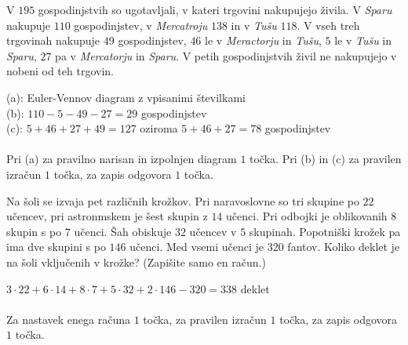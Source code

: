 \documentclass[addpoints]{exam}
\begin{document}
\begin{questions}
    \question
    V $195$ gospodinjstvih so ugotavljali, v kateri trgovini nakupujejo živila. V \textit{Sparu} nakupuje $110$ gospodinjstev, v \textit{Mercatroju} $138$ in v \textit{Tušu} $118$.
    V vseh treh trgovinah nakupuje $49$ gospodinjstev, $46$ le v \textit{Meractorju} in \textit{Tušu}, $5$ le v \textit{Tušu} in \textit{Sparu}, $27$ pa v \textit{Mercatorju} in \textit{Sparu}. 
    V petih gospodinjstvih živil ne nakupujejo v nobeni od teh trgovin.

    \begin{solution}[8.5cm]
        (a): Euler-Vennov diagram z vpisanimi številkami \\
        (b): $110-5-49-27=29$ gospodinjstev\\
        (c): $5+46+27+49=127$ oziroma $5+46+27=78$ gospodinjstev \\ \\
        Pri (a) za pravilno narisan in izpolnjen diagram $1$ točka. Pri (b) in (c) za pravilen izračun $1$ točka, za zapis odgovora $1$ točka.
    \end{solution}




     \newpage
        

    \question[3]
    Na šoli se izvaja pet različnih krožkov. Pri naravoslovne so tri skupine po $22$ učencev, pri astronmskem je šest skupin z $14$ učenci. Pri odbojki je oblikovanih $8$ skupin s po $7$ učenci. Šah obiskuje $32$ učencev v $5$ skupinah. Popotniški krožek pa ima dve skupini s po $146$ učenci.
    Med vsemi učenci je 320 fantov. Koliko deklet je na šoli vključenih v krožke? (Zapišite samo en račun.)

    \begin{solution}[8cm]
        $3\cdot 22+6\cdot 14+8\cdot 7+5\cdot 32+2\cdot 146-320=338$ deklet \\ \\
        Za nastavek enega računa $1$ točka, za pravilen izračun $1$ točka, za zapis odgovora $1$ točka.
    \end{solution}


\end{questions}
\end{document}
